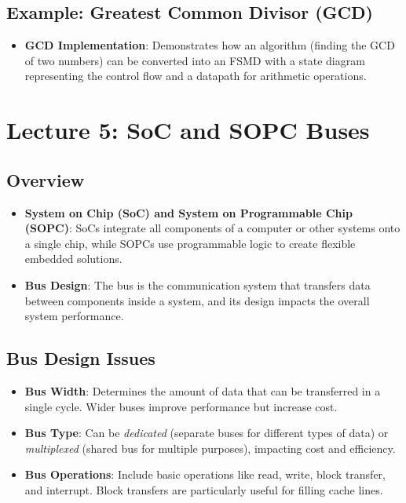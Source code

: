 \documentclass[
  14pt,
  a4paper,
  DIV=11,
  numbers=noendperiod,
  headinclude=true,
  footinclude=true]{scrreprt}
\providecommand{\tightlist}{%
  \setlength{\itemsep}{0pt}\setlength{\parskip}{0pt}}\usepackage{longtable,booktabs,array}
\begin{document}
\section{Example: Greatest Common Divisor
(GCD)}\label{example-greatest-common-divisor-gcd}

\begin{itemize}
\tightlist
\item
  \textbf{GCD Implementation}: Demonstrates how an algorithm (finding
  the GCD of two numbers) can be converted into an FSMD with a state
  diagram representing the control flow and a datapath for arithmetic
  operations.
\end{itemize}

\chapter{Lecture 5: SoC and SOPC
Buses}\label{lecture-5-soc-and-sopc-buses}

\section{Overview}\label{overview-2}

\begin{itemize}
\tightlist
\item
  \textbf{System on Chip (SoC) and System on Programmable Chip (SOPC)}:
  SoCs integrate all components of a computer or other systems onto a
  single chip, while SOPCs use programmable logic to create flexible
  embedded solutions.
\item
  \textbf{Bus Design}: The bus is the communication system that
  transfers data between components inside a system, and its design
  impacts the overall system performance.
\end{itemize}

\section{Bus Design Issues}\label{bus-design-issues}

\begin{itemize}
\tightlist
\item
  \textbf{Bus Width}: Determines the amount of data that can be
  transferred in a single cycle. Wider buses improve performance but
  increase cost.
\item
  \textbf{Bus Type}: Can be \emph{dedicated} (separate buses for
  different types of data) or \emph{multiplexed} (shared bus for
  multiple purposes), impacting cost and efficiency.
\item
  \textbf{Bus Operations}: Include basic operations like read, write,
  block transfer, and interrupt. Block transfers are particularly useful
  for filling cache lines.
\end{itemize}
\end{document}

